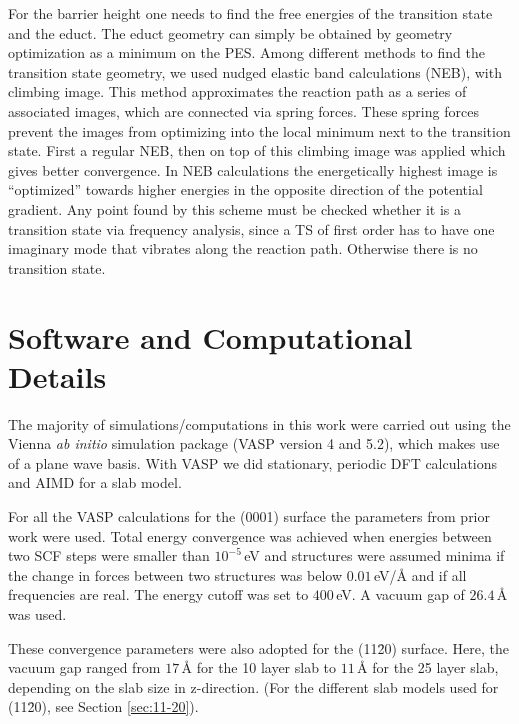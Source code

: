 \documentclass[11pt,DIV=13,BCOR=5mm,a4paper,headinclude]{scrbook}
\begin{document}
For the barrier height one needs to find the free energies of the transition state and the educt.
The educt geometry can simply be obtained by geometry optimization as a minimum on the PES.
Among different methods to find the transition state geometry, we used nudged elastic band calculations (NEB)\cite{Henkelman00a}, with climbing image\cite{Henkelman00b}.
This method approximates the reaction path as a series of associated images, which are connected via spring forces.
These spring forces prevent the images from optimizing into the local minimum next to the transition state.
First a regular NEB, then on top of this climbing image was applied which gives better convergence.
In NEB calculations the energetically highest image is ``optimized'' towards higher energies in the opposite direction of the potential gradient.
Any point found by this scheme must be checked whether it is a transition state via frequency analysis, since a TS of first order has to have one imaginary mode that vibrates along the reaction path.
Otherwise there is no transition state.

\section{Software and Computational Details}
The majority of simulations/computations in this work were carried out using the Vienna \textit{ab initio} simulation package (VASP version 4 and 5.2)\cite{kresse1993,kresse2,kresse3,kresse4,kresse99}, which makes use of a plane wave basis.
With VASP we did stationary, periodic DFT calculations and AIMD for a slab model.


For all the VASP calculations for the (0001) surface the parameters from prior work\cite{WirthJPCC2012,Wirth2014,Wirth2015,Wirth2016} were used.
Total energy convergence was achieved when energies between two SCF steps were smaller than $10^{-5}\,$eV and structures were assumed minima if the change in forces between two structures was below $0.01\,$eV/\AA{} and if all frequencies are real.
The energy cutoff was set to $400\,$eV.
A vacuum gap of $26.4\,$\AA{} was used.


These convergence parameters were also adopted for the (11\=20) surface.
Here, the vacuum gap ranged from $17\,$\AA{} for the 10 layer slab to $11\,$\AA{} for the 25 layer slab, depending on the slab size in z-direction.
(For the different slab models used for (11\=20), see Section \ref{sec:11-20}).
\\\\
\end{document}
